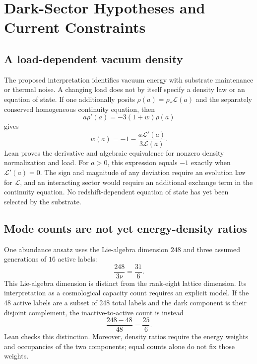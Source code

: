 \section{Dark-Sector Hypotheses and Current Constraints}
\subsection{A load-dependent vacuum density}
The proposed interpretation identifies vacuum energy with substrate maintenance or thermal noise. A changing load does not by itself specify a density law or an equation of state. If one additionally posits $\rho(a)=\rho_*\mathcal L(a)$ and the separately conserved homogeneous continuity equation, then
\begin{equation}
a\rho'(a)=-3(1+w)\rho(a)
\end{equation}
gives
\begin{equation}
w(a)=-1-\frac{a\mathcal L'(a)}{3\mathcal L(a)}.
\end{equation}
Lean proves the derivative and algebraic equivalence for nonzero density normalization and load. For $a>0$, this expression equals $-1$ exactly when $\mathcal L'(a)=0$. The sign and magnitude of any deviation require an evolution law for $\mathcal L$, and an interacting sector would require an additional exchange term in the continuity equation. No redshift-dependent equation of state has yet been selected by the substrate.


\subsection{Mode counts are not yet energy-density ratios}
One abundance ansatz uses the Lie-algebra dimension $248$ and three assumed generations of $16$ active labels:
\begin{equation}
\frac{248}{3\nu}=\frac{31}{6}.
\end{equation}
This Lie-algebra dimension is distinct from the rank-eight lattice dimension. Its interpretation as a cosmological capacity count requires an explicit model. If the 48 active labels are a subset of 248 total labels and the dark component is their disjoint complement, the inactive-to-active count is instead
\begin{equation}
\frac{248-48}{48}=\frac{25}{6}.
\end{equation}
Lean checks this distinction. Moreover, density ratios require the energy weights and occupancies of the two components; equal counts alone do not fix those weights.

